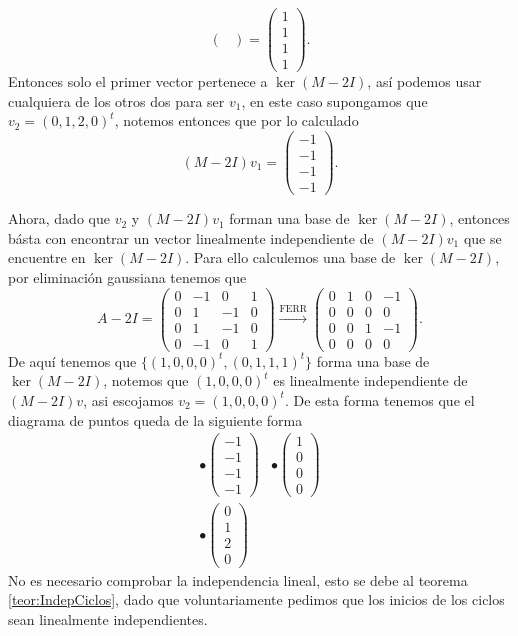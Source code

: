 \begin{example}
\[\begin{pmatrix}
      \end{pmatrix} = \begin{pmatrix}
        1 \\ 1 \\ 1 \\ 1
      \end{pmatrix}.
  \]
  Entonces solo el primer vector pertenece a $\ker(M-2I)$, así podemos usar cualquiera de los otros dos para ser $v_1$, en este caso supongamos que $v_2 = (0,1,2,0)^t$, notemos entonces que por lo calculado
    \[
      (M-2I)v_1 = \begin{pmatrix}
        -1 \\ -1 \\ -1 \\ -1
      \end{pmatrix}.
    \]

  Ahora, dado que $v_2$ y $(M-2I)v_1$ forman una base de $\ker(M-2I)$, entonces básta con encontrar un vector linealmente independiente de $(M-2I)v_1$ que se encuentre en $\ker(M-2I)$. Para ello calculemos una base de $\ker(M-2I)$, por eliminación gaussiana tenemos que
    \[
      A-2I = \begin{pmatrix} 0 & -1 & 0 & 1 \\ 0 & 1 & -1 & 0 \\ 0 & 1 & -1 & 0 \\ 0 & -1 &0 & 1 \end{pmatrix}
        \xrightarrow{\text{FERR}}
        \begin{pmatrix} 0 & 1 & 0 & -1 \\ 0 & 0 & 0 & 0 \\ 0 & 0 & 1 & -1 \\ 0 & 0 & 0 & 0 \end{pmatrix}.
    \]
  De aquí tenemos que $\{(1,0,0,0)^t, (0,1,1,1)^t\}$ forma una base de $\ker(M-2I)$, notemos que $(1,0,0,0)^t$ es linealmente independiente de $(M-2I)v$, asi escojamos $v_2 = (1,0,0,0)^t$. De esta forma tenemos que el diagrama de puntos queda de la siguiente forma
  \[
    \begin{array}{ll}
      \bullet \begin{pmatrix} -1 \\ -1 \\ -1 \\ -1 \end{pmatrix} & \bullet \begin{pmatrix}1 \\ 0 \\ 0 \\ 0\end{pmatrix}\\
      \bullet \begin{pmatrix} 0 \\ 1 \\ 2 \\ 0 \end{pmatrix}
    \end{array}
  \]
  No es necesario comprobar la independencia lineal, esto se debe al teorema \ref{teor:IndepCiclos}, dado que voluntariamente pedimos que los inicios de los ciclos sean linealmente independientes.


\end{example}

